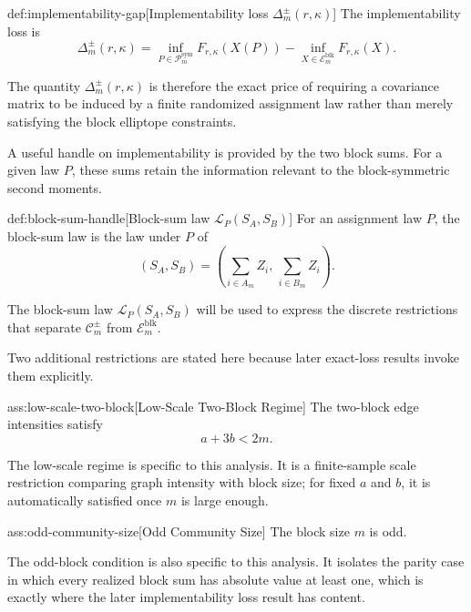 \begin{definitionv}{def:implementability-gap}[Implementability loss $\Delta_m^{\pm}(r,\kappa)$]
The implementability loss is
\[
\Delta_m^{\pm}(r,\kappa)
=
\inf_{P\in \mathcal P_m^{\mathrm{sym}}}
F_{r,\kappa}(X(P))
-
\inf_{X\in \mathcal E_m^{\mathrm{blk}}}
F_{r,\kappa}(X).
\]
\end{definitionv}

The quantity \ensuremath{\Delta_m^{\pm}(r,\kappa)} is therefore the exact price of requiring a covariance matrix to be induced by a finite randomized assignment law rather than merely satisfying the block elliptope constraints.

A useful handle on implementability is provided by the two block sums. For a given law \(P\), these sums retain the information relevant to the block-symmetric second moments.

\begin{definitionv}{def:block-sum-handle}[Block-sum law $\mathcal L_P(S_A,S_B)$]
For an assignment law $P$, the block-sum law is the law under $P$ of
\[
(S_A,S_B)
=
\left(
\sum_{i\in A_m} Z_i,\,
\sum_{i\in B_m} Z_i
\right).
\]
\end{definitionv}

The block-sum law \(\mathcal L_P(S_A,S_B)\) will be used to express the discrete restrictions that separate \(\mathcal C_m^{\pm}\) from \(\mathcal E_m^{\mathrm{blk}}\).

Two additional restrictions are stated here because later exact-loss results invoke them explicitly.

\begin{assumptionv}{ass:low-scale-two-block}[Low-Scale Two-Block Regime]
The two-block edge intensities satisfy
\[
a+3b<2m.
\]
\end{assumptionv}

The low-scale regime is specific to this analysis. It is a finite-sample scale restriction comparing graph intensity with block size; for fixed \(a\) and \(b\), it is automatically satisfied once \(m\) is large enough.

\begin{assumptionv}{ass:odd-community-size}[Odd Community Size]
The block size \(m\) is odd.
\end{assumptionv}

The odd-block condition is also specific to this analysis. It isolates the parity case in which every realized block sum has absolute value at least one, which is exactly where the later implementability loss result has content.

